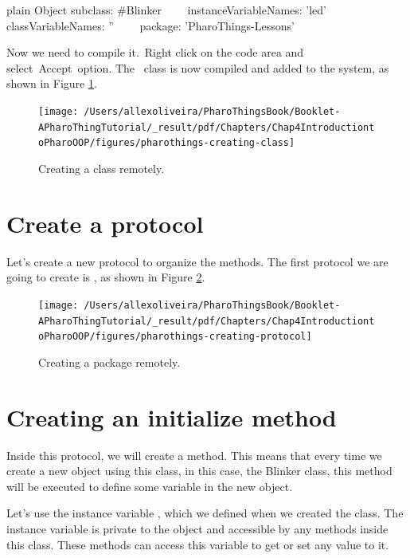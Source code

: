 \documentclass[10pt,twoside,english]{_support/latex/sbabook/sbabook}
\begin{document}
\begin{displaycode}{plain}
Object subclass: #Blinker
  instanceVariableNames: 'led'
  classVariableNames: ''
  package: 'PharoThings-Lessons'
\end{displaycode}

Now we need to compile it. Right click on the code area and select Accept option. The  class is now compiled and added to the system, as shown in Figure \ref{CreatingClass}.


\begin{figure}

\begin{center}
\texttt{[image: /Users/allexoliveira/PharoThingsBook/Booklet-APharoThingTutorial/\_result/pdf/Chapters/Chap4IntroductiontoPharoOOP/figures/pharothings-creating-class]}\caption{Creating a class remotely.\label{CreatingClass}}\end{center}
\end{figure}

\section{Create a protocol}
Let's create a new protocol to organize the methods. The first protocol we are going to create is , as shown in Figure \ref{CreatingProtocol}.


\begin{figure}

\begin{center}
\texttt{[image: /Users/allexoliveira/PharoThingsBook/Booklet-APharoThingTutorial/\_result/pdf/Chapters/Chap4IntroductiontoPharoOOP/figures/pharothings-creating-protocol]}\caption{Creating a package remotely.\label{CreatingProtocol}}\end{center}
\end{figure}

\section{Creating an initialize method}
Inside this protocol, we will create a  method. This means that every time we create a new object using this class, in this case, the Blinker class, this method will be executed to define some variable in the new object.

Let's use the instance variable , which we defined when we created the class. The instance variable is private to the object and accessible by any methods inside this class. These methods can access this variable to get or set any value to it.
\end{document}

